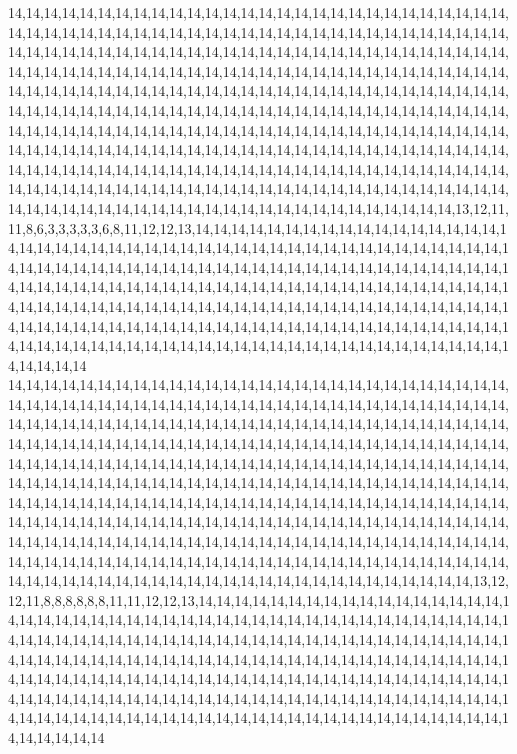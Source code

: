 14,14,14,14,14,14,14,14,14,14,14,14,14,14,14,14,14,14,14,14,14,14,14,14,14,14,14,14,14,14,14,14,14,14,14,14,14,14,14,14,14,14,14,14,14,14,14,14,14,14,14,14,14,14,14,14,14,14,14,14,14,14,14,14,14,14,14,14,14,14,14,14,14,14,14,14,14,14,14,14,14,14,14,14,14,14,14,14,14,14,14,14,14,14,14,14,14,14,14,14,14,14,14,14,14,14,14,14,14,14,14,14,14,14,14,14,14,14,14,14,14,14,14,14,14,14,14,14,14,14,14,14,14,14,14,14,14,14,14,14,14,14,14,14,14,14,14,14,14,14,14,14,14,14,14,14,14,14,14,14,14,14,14,14,14,14,14,14,14,14,14,14,14,14,14,14,14,14,14,14,14,14,14,14,14,14,14,14,14,14,14,14,14,14,14,14,14,14,14,14,14,14,14,14,14,14,14,14,14,14,14,14,14,14,14,14,14,14,14,14,14,14,14,14,14,14,14,14,14,14,14,14,14,14,14,14,14,14,14,14,14,14,14,14,14,14,14,14,14,14,14,14,14,14,14,14,14,14,14,14,14,14,14,14,14,14,14,14,14,14,14,14,14,14,14,14,14,14,14,14,14,14,14,14,14,14,14,14,14,14,14,14,14,14,14,14,14,14,14,14,14,14,14,14,14,13,12,11,11,8,6,3,3,3,3,3,6,8,11,12,12,13,14,14,14,14,14,14,14,14,14,14,14,14,14,14,14,14,14,14,14,14,14,14,14,14,14,14,14,14,14,14,14,14,14,14,14,14,14,14,14,14,14,14,14,14,14,14,14,14,14,14,14,14,14,14,14,14,14,14,14,14,14,14,14,14,14,14,14,14,14,14,14,14,14,14,14,14,14,14,14,14,14,14,14,14,14,14,14,14,14,14,14,14,14,14,14,14,14,14,14,14,14,14,14,14,14,14,14,14,14,14,14,14,14,14,14,14,14,14,14,14,14,14,14,14,14,14,14,14,14,14,14,14,14,14,14,14,14,14,14,14,14,14,14,14,14,14,14,14,14,14,14,14,14,14,14,14,14,14,14,14,14,14,14,14,14,14,14,14,14,14,14,14,14,14,14,14,14,14,14,14,14,14,14,14,14,14,14,14,14,14
14,14,14,14,14,14,14,14,14,14,14,14,14,14,14,14,14,14,14,14,14,14,14,14,14,14,14,14,14,14,14,14,14,14,14,14,14,14,14,14,14,14,14,14,14,14,14,14,14,14,14,14,14,14,14,14,14,14,14,14,14,14,14,14,14,14,14,14,14,14,14,14,14,14,14,14,14,14,14,14,14,14,14,14,14,14,14,14,14,14,14,14,14,14,14,14,14,14,14,14,14,14,14,14,14,14,14,14,14,14,14,14,14,14,14,14,14,14,14,14,14,14,14,14,14,14,14,14,14,14,14,14,14,14,14,14,14,14,14,14,14,14,14,14,14,14,14,14,14,14,14,14,14,14,14,14,14,14,14,14,14,14,14,14,14,14,14,14,14,14,14,14,14,14,14,14,14,14,14,14,14,14,14,14,14,14,14,14,14,14,14,14,14,14,14,14,14,14,14,14,14,14,14,14,14,14,14,14,14,14,14,14,14,14,14,14,14,14,14,14,14,14,14,14,14,14,14,14,14,14,14,14,14,14,14,14,14,14,14,14,14,14,14,14,14,14,14,14,14,14,14,14,14,14,14,14,14,14,14,14,14,14,14,14,14,14,14,14,14,14,14,14,14,14,14,14,14,14,14,14,14,14,14,14,14,14,14,14,14,14,14,14,14,14,14,14,14,14,14,14,14,14,14,14,14,14,13,12,12,11,8,8,8,8,8,8,11,11,12,12,13,14,14,14,14,14,14,14,14,14,14,14,14,14,14,14,14,14,14,14,14,14,14,14,14,14,14,14,14,14,14,14,14,14,14,14,14,14,14,14,14,14,14,14,14,14,14,14,14,14,14,14,14,14,14,14,14,14,14,14,14,14,14,14,14,14,14,14,14,14,14,14,14,14,14,14,14,14,14,14,14,14,14,14,14,14,14,14,14,14,14,14,14,14,14,14,14,14,14,14,14,14,14,14,14,14,14,14,14,14,14,14,14,14,14,14,14,14,14,14,14,14,14,14,14,14,14,14,14,14,14,14,14,14,14,14,14,14,14,14,14,14,14,14,14,14,14,14,14,14,14,14,14,14,14,14,14,14,14,14,14,14,14,14,14,14,14,14,14,14,14,14,14,14,14,14,14,14,14,14,14,14,14,14,14,14,14,14,14,14,14,14
